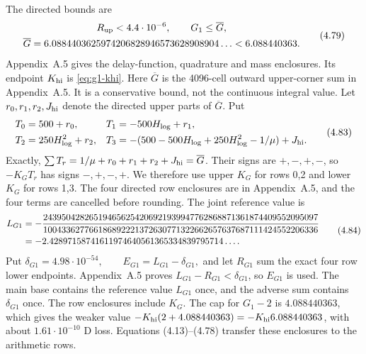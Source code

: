 The directed bounds are
\[
\begin{gathered}
 R_{\rm up}<4.4\cdot10^{-6},\qquad G_1\le\overline G,\\
 \overline G=6.0884403625974206828946573628908904\ldots<6.088440363.
\end{gathered}
 \tag{4.79}
\]
Appendix~A.5 gives the delay-function, quadrature and mass enclosures.
Its endpoint $K_{\rm hi}$ is \eqref{eq:g1-khi}.
Here $\overline G$ is the 4096-cell outward upper-corner sum in Appendix~A.5.
It is a conservative bound, not the continuous integral value.
Let $r_0,r_1,r_2,J_{\rm hi}$ denote the directed upper parts of $\overline G$.
Put
\[
\begin{aligned}
 T_0&=500+r_0,&T_1&=-500H_{\log}+r_1,\\
 T_2&=250H_{\log}^2+r_2,&
 T_3&=-(500-500H_{\log}+250H_{\log}^2-1/\mu)+J_{\rm hi}.
\end{aligned}
 \tag{4.83}
\]
Exactly, $\sum T_r=1/\mu+r_0+r_1+r_2+J_{\rm hi}=\overline G$.
Their signs are $+,-,+,-$, so $-K_GT_r$ has signs $-,+,-,+$.
We therefore use upper $K_G$ for rows 0,2 and lower $K_G$ for rows 1,3.
The four directed row enclosures are in Appendix~A.5,
and the four terms are cancelled before rounding.
The joint reference value is
\[
\begin{aligned}
 L_{G1}&=
 -{243950428265194656254206921939947762868871361874409552095097
 \over100433627766186892221372630771322662657637687111424552206336}\\
 &=-2.42897158741611974640561365334839795714\ldots .
\end{aligned}
 \tag{4.84}
\]
Put
$\delta_{G1}=4.98\cdot10^{-54},\qquad
 E_{G1}=L_{G1}-\delta_{G1},$
and let $R_{G1}$ sum the exact four row lower endpoints.
Appendix~A.5 proves $L_{G1}-R_{G1}<\delta_{G1}$, so $E_{G1}$ is used.
The main base contains the reference value $L_{G1}$ once,
and the adverse sum contains $\delta_{G1}$ once.
The row enclosures include $K_G$.
The cap for $G_1-2$ is $4.088440363$, which gives the weaker value $-K_{\rm hi}(2+4.088440363)=-K_{\rm hi}6.088440363$,
with about $1.61\cdot10^{-10}$ D loss.
Equations (4.13)--(4.78) transfer these enclosures to the arithmetic rows.

